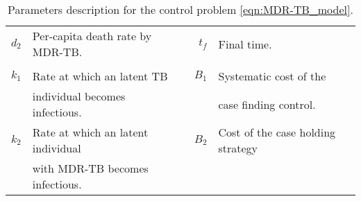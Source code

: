 \begin{table}[htb]
\begin{tabular}{rllrl}
          \\
      $d_2$ 
          & Per-capita  death rate by MDR-TB.
          &&
            $t_f$ 
              & Final time.
          \\
      \\
      $k_1$ 
        & Rate at which an latent TB 
        &&
          $B_1$ 
            &
              Systematic cost of the
        \\
        & individual becomes infectious. 
          &&&
            case finding  control.
      \\
          $k_2$  
          & Rate at which an latent individual
          &&
            $B_2$
            & 
            Cost of the case holding strategy
          \\
          & with MDR-TB becomes infectious.
    \\
    \bottomrule
    \end{tabular}
  \caption{Parameters description for the control 
  problem \eqref{eqn:MDR-TB_model}.}
  \label{tbl:parameters_MDR-TB_model_des}
\end{table}

%
